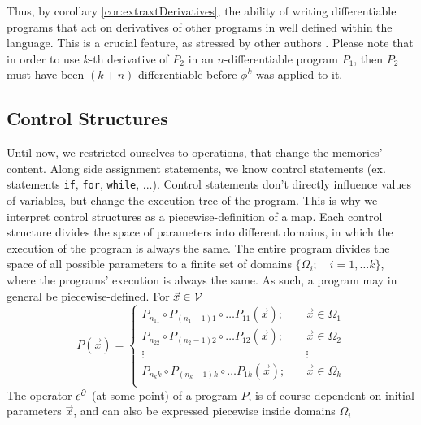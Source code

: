 Thus, by corollary \ref{cor:extraxtDerivatives}, the ability of writing differentiable programs that act on derivatives of other programs in well defined within the language. This is a crucial feature, as stressed by other authors \cite{AD1,AD2}. Please note that in order to use $k$-th derivative of $P_2$ in an $n$-differentiable program $P_1$, then $P_2$ must have been $(k+n)$-differentiable before $\phi^k$ was applied to it.


\subsection{Control Structures}\label{sec:control}
 
 Until now, we restricted ourselves to operations, that change the memories' content. Along side assignment statements, we know control statements (ex. statements \texttt{if},
  \texttt{for}, \texttt{while}, ...). Control statements don't directly
  influence values of variables, but change the execution tree of the program. This is why
  we interpret control structures as a piecewise-definition of a map.
 Each control structure divides the space of parameters into different domains, in which the execution of the program is always the same. The entire program divides the space of all possible parameters to a finite set of domains $\{\Omega_i;\quad i=1,\ldots
  k\}$, where the programs' execution is always the same. As such, a program may in general be piecewise-defined. For $\vec{x}\in\mathcal{V}$
 \begin{equation}
   \label{eq:zlrprk_splosno}
   P(\vec{x}) =
   \left\{\!\begin{matrix}
     P_{n_11}\circ P_{(n_1-1)1}\circ\ldots P_{11}(\vec{x});&\quad \vec{x}\in\Omega_1\\
     P_{n_22}\circ P_{(n_2-1)2}\circ\ldots P_{12}(\vec{x});&\quad \vec{x}\in\Omega_2\\
     \vdots&\quad\vdots\\
     P_{n_kk}\circ P_{(n_k-1)k}\circ\ldots P_{1k}(\vec{x});&\quad \vec{x}\in\Omega_k\\
   \end{matrix}\right.
 \end{equation}
 The operator $e^\partial$ (at some point) of a program $P$, is of course dependent on initial parameters $\vec{x}$, and can also be expressed piecewise inside domains $\Omega_i$




